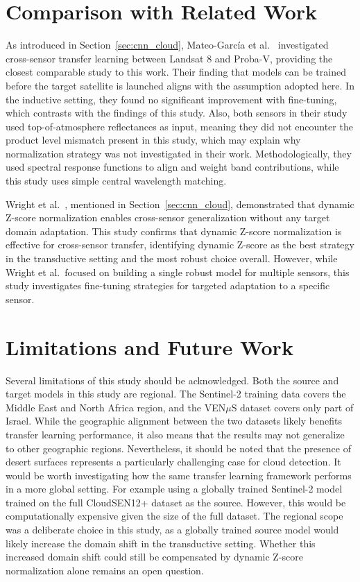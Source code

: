 \section{Comparison with Related Work}
\label{sec:discussion_related}

As introduced in Section~\ref{sec:cnn_cloud}, Mateo-García et al.~\cite{garcia2020} investigated cross-sensor transfer learning between Landsat 8 and Proba-V, providing the closest comparable study to this work. Their finding that models can be trained before the target satellite is launched aligns with the assumption adopted here. In the inductive setting, they found no significant improvement with fine-tuning, which contrasts with the findings of this study. Also, both sensors in their study used top-of-atmosphere reflectances as input, meaning they did not encounter the product level mismatch present in this study, which may explain why normalization strategy was not investigated in their work. Methodologically, they used spectral response functions to align and weight band contributions, while this study uses simple central wavelength matching.

Wright et al.~\cite{wright2025}, mentioned in Section~\ref{sec:cnn_cloud}, demonstrated that dynamic Z-score normalization enables cross-sensor generalization without any target domain adaptation. This study confirms that dynamic Z-score normalization is effective for cross-sensor transfer, identifying dynamic Z-score as the best strategy in the transductive setting and the most robust choice overall. However, while Wright et al.\ focused on building a single robust model for multiple sensors, this study investigates fine-tuning strategies for targeted adaptation to a specific sensor.


\section{Limitations and Future Work}
\label{sec:discussion_limitations}

Several limitations of this study should be acknowledged. Both the source and target models in this study are regional. The Sentinel-2 training data covers the Middle East and North Africa region, and the VEN$\mu$S dataset covers only part of Israel. While the geographic alignment between the two datasets likely benefits transfer learning performance, it also means that the results may not generalize to other geographic regions. Nevertheless, it should be noted that the presence of desert surfaces represents a particularly challenging case for cloud detection. It would be worth investigating how the same transfer learning framework performs in a more global setting. For example using a globally trained Sentinel-2 model trained on the full CloudSEN12+ dataset as the source. However, this would be computationally expensive given the size of the full dataset. The regional scope was a deliberate choice in this study, as a globally trained source model would likely increase the domain shift in the transductive setting. Whether this increased domain shift could still be compensated by dynamic Z-score normalization alone remains an open question.

